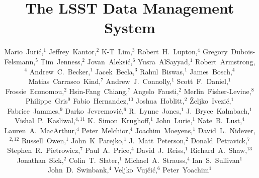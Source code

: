 \documentclass[11pt,twoside]{article}
\begin{document}
\title{The LSST Data Management System}
\author{
Mario~Juri\'c,$^1$
Jeffrey~Kantor,$^2$
K-T~Lim,$^3$
Robert~H.~Lupton,$^4$
Gregory~Dubois-Felsmann,$^5$
Tim~Jenness,$^2$
Jovan~Aleksi\'c,$^6$
Yusra~AlSayyad,$^1$
Robert~Armstrong,$^4$
Andrew~C.~Becker,$^1$
Jacek~Becla,$^3$
Rahul~Biswas,$^1$
James~Bosch,$^4$
Matias~Carrasco~Kind,$^7$
Andrew~J.~Connolly,$^1$
Scott~F.~Daniel,$^1$
Frossie~Economou,$^2$
Hsin-Fang~Chiang,$^7$
Angelo~Fausti,$^2$
Merlin~Fisher-Levine,$^8$
Philippe~Gris$^9$
Fabio~Hernandez,$^{10}$
Joshua~Hoblitt,$^2$
\v{Z}eljko~Ivezi\'{c},$^1$
Fabrice~Jammes,$^9$
Darko~Jevremovi\'c,$^6$
R.~Lynne~Jones,$^1$
J.~Bryce~Kalmbach,$^1$
Vishal~P.~Kasliwal,$^{4,11}$
K.~Simon~Krughoff,$^1$
John~Lurie,$^1$
Nate~B.~Lust,$^4$
Lauren~A.~MacArthur,$^4$
Peter~Melchior,$^4$
Joachim~Moeyens,$^1$
David~L.~Nidever,$^{2,12}$
Russell~Owen,$^1$
John~K~Parejko,$^1$
J.~Matt~Peterson,$^2$
Donald~Petravick,$^7$
Stephen~R.~Pietrowicz,$^7$
Paul~A.~Price,$^4$
David~J.~Reiss,$^1$
Richard~A.~Shaw,$^{13}$
Jonathan~Sick,$^2$
Colin~T.~Slater,$^1$
Michael~A.~Strauss,$^4$
Ian~S.~Sullivan$^1$
John~D.~Swinbank,$^4$
Veljko~Vuj\v ci\'c,$^6$
Peter~Yoachim$^1$
%
}
\end{document}
